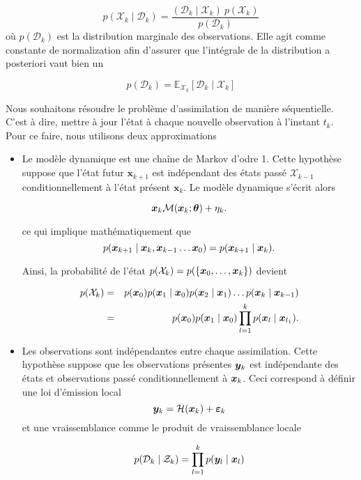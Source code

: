 \begin{equation*}
    p(\mathcal X_k \mid \mathcal D_k) = \frac{(\mathcal D_k \mid \mathcal X_k)~p(\mathcal X_k)}{p(\mathcal D_k)}
\end{equation*}où $p(\mathcal D_k)$  est la distribution marginale des observations. Elle agit comme constante de normalization afin d'assurer que l'intégrale de la distribution a posteriori vaut bien un

\begin{equation*}
    p(\mathcal D_k) = \mathbb E_{\mathcal X_k}[\mathcal D_k \mid \mathcal X_k]
\end{equation*}

Nous souhaitons résoudre le problème d'assimilation de manière séquentielle. C'est à dire, mettre à jour l'état à chaque nouvelle observation à l'instant $t_k$. Pour ce faire, nous utilisons deux approximations

\begin{itemize}
    \item Le modèle dynamique est une chaîne de Markov d'odre 1. Cette hypothèse suppose que l'état futur $\bm x_{k+1}$ est indépendant des états passé $\mathcal X_{k-1}$ conditionnellement à l'état présent $\bm x_{k}$. Le modèle dynamique s'écrit alors

          \begin{equation*}
              \bm x_k \mathcal{M}(\bm{x}_k ; \bm \theta) + \eta_k.
          \end{equation*}

          ce qui implique mathématiquement que
          \begin{equation*}
              p(\bx_{k+1} \mid \bx_{k},\bx_{k-1}\dots \bx_{0}) = p(\bx_{k+1} \mid \bx_{k}).
          \end{equation*}

          Ainsi, la probabilité de l'état $p(\mathcal{X}_k)=p(\{\bm{x}_0, \dots, \bm{x}_k\})$ devient

          \begin{eqnarray*}
              p(\mathcal{X}_k) &=& p(\bm{x}_0) p(\bm{x}_1 \mid \bm{x}_0) p(\bm{x}_2 \mid \bm{x}_1) \dots p(\bm{x}_k \mid \bm{x}_{k-1}) \\
              &=& p(\bm{x}_0) p(\bm{x}_1 \mid \bm{x}_0) \prod_{l = 1}^{k} p(\bm{x}_l \mid \bm{x}_{l_1}).
          \end{eqnarray*}

    \item Les observations sont indépendantes entre chaque assimilation. Cette hypothèse suppose que les observations présentes $\bm{y}_k$ est indépendante des états et observations passé conditionnellement à $\bm{x}_k$. Ceci correspond à définir une loi d'émission local
          \begin{equation*}
              \bm{y}_k = \mathcal H (\bm{x}_k) + \bm{\varepsilon}_k
          \end{equation*}
          et une vraissemblance comme le produit de vraissemblance locale

          \begin{equation*}
              p(\mathcal{D}_k \mid \mathcal Z_k) = \prod_{l=1}^{k} p(\bm{y}_l \mid \bm{x}_l)
          \end{equation*}
\end{itemize}


